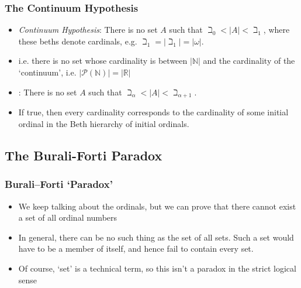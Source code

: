 \begin{frame}
\frametitle{The Continuum Hypothesis}

\begin{itemize}[<+->]

\item \emph{Continuum Hypothesis}: There is no set $A$ such that \(\beth_0 < |A| < \beth_1\), where these beths denote cardinals, e.g. $\beth_1 = |\beth_1| = |\omega|$.

\item i.e. there is no set whose cardinality is between $|\mathbb{N}|$ and the cardinality of the `continuum', i.e. $|\mathcal{P}(\mathbb{N})| = |\mathbb{R}|$

\item {}: There is no set \(A\) such that \(\beth_\alpha < |A| < \beth_{\alpha + 1}\).

\item If true, then every cardinality corresponds to the cardinality of some initial ordinal in the Beth hierarchy of initial ordinals. 


\end{itemize}
\end{frame}


\subsection{The Burali-Forti Paradox}

\begin{frame}
\frametitle{Burali--Forti `Paradox'}

\begin{itemize}[<+->]

\item We keep talking about the ordinals, but we can prove that there cannot exist a set of all ordinal numbers

\item In general, there can be no such thing as the set of all sets. Such a set would have to be a member of itself, and hence fail to contain every set.

\item Of course, `set' is a technical term, so this isn't a paradox in the strict logical sense

\end{itemize}
\end{frame}

